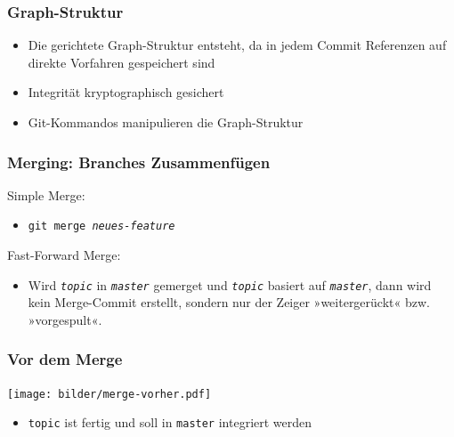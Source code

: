 \documentclass{beamer}
\begin{document}
\begin{frame}
 \frametitle{Graph-Struktur}



\begin{itemize}
	\item Die gerichtete Graph-Struktur entsteht, da in jedem Commit Referenzen auf direkte Vorfahren gespeichert sind
\end{itemize}

\begin{itemize}
	\item Integrität kryptographisch gesichert
\end{itemize}

\begin{itemize}
	\item Git-Kommandos manipulieren die Graph-Struktur
\end{itemize}


 \end{frame}
\begin{frame}
 \frametitle{Merging: Branches Zusammenfügen}



Simple Merge:
\begin{itemize}
	\item \texttt{git merge \emph{neues-feature}}
\end{itemize}


\vspace{.5cm}


Fast-Forward Merge:
\begin{itemize}
	\item Wird \texttt{\emph{topic}} in \texttt{\emph{master}} gemerget und \texttt{\emph{topic}} basiert auf \texttt{\emph{master}}, dann wird kein Merge-Commit erstellt, sondern nur der Zeiger »weitergerückt« bzw. »vorgespult«.
\end{itemize}


 \end{frame}
\begin{frame}
 \frametitle{Vor dem Merge}



\begin{center}
\texttt{[image: bilder/merge-vorher.pdf]}
\end{center}

\begin{itemize}
	\item \texttt{topic} ist fertig und soll in \texttt{master} integriert werden
\end{itemize}


 \end{frame}
\end{document}
